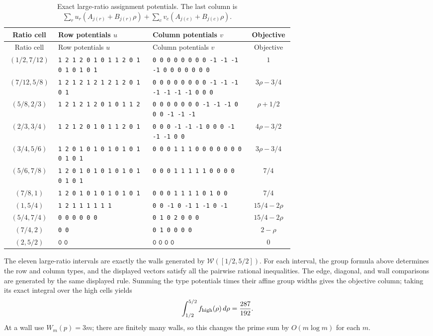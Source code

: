 \renewcommand{\arraystretch}{1.15}
\normalsize
\begin{longtable}{@{}c p{0.33\linewidth}p{0.34\linewidth}c@{}}
\caption{Exact large-ratio assignment potentials.  The last column is
  $\sum_r u_r(A_{j(r)}+B_{j(r)}\rho)+
    \sum_c v_c(A_{j(c)}+B_{j(c)}\rho)$.}\label{tab:p0-high-potentials}\\
\toprule
Ratio cell & Row potentials $u$ & Column potentials $v$ & Objective \\
\midrule
\endfirsthead
\toprule
Ratio cell & Row potentials $u$ & Column potentials $v$ & Objective \\
\midrule
\endhead
$(1/2,7/12)$ &
\texttt{1 2 1 2 0 1 0 1 1 2 0 1 0 1 0 1 0 1} &
\texttt{0 0 0 0 0 0 0 0 -1 -1 -1 -1 0 0 0 0 0 0 0} & $1$ \\
$(7/12,5/8)$ &
\texttt{1 2 1 2 1 2 1 2 1 2 0 1 0 1} &
\texttt{0 0 0 0 0 0 0 0 -1 -1 -1 -1 -1 -1 -1 0 0 0} & $3\rho-3/4$ \\
$(5/8,2/3)$ &
\texttt{1 2 1 2 1 2 0 1 0 1 1 2} &
\texttt{0 0 0 0 0 0 0 -1 -1 -1 0 0 0 -1 -1 -1} & $\rho+1/2$ \\
$(2/3,3/4)$ &
\texttt{1 2 1 2 0 1 0 1 1 2 0 1} &
\texttt{0 0 0 -1 -1 -1 0 0 0 -1 -1 -1 0 0} & $4\rho-3/2$ \\
$(3/4,5/6)$ &
\texttt{1 2 0 1 0 1 0 1 0 1 0 1 0 1 0 1} &
\texttt{0 0 0 1 1 1 0 0 0 0 0 0 0} & $3\rho-3/4$ \\
$(5/6,7/8)$ &
\texttt{1 2 0 1 0 1 0 1 0 1 0 1 0 1 0 1} &
\texttt{0 0 0 1 1 1 1 1 0 0 0 0} & $7/4$ \\
$(7/8,1)$ &
\texttt{1 2 0 1 0 1 0 1 0 1 0 1} &
\texttt{0 0 0 1 1 1 1 0 1 0 0} & $7/4$ \\
$(1,5/4)$ &
\texttt{1 2 1 1 1 1 1 1} &
\texttt{0 0 -1 0 -1 1 -1 0 -1} & $15/4-2\rho$ \\
$(5/4,7/4)$ &
\texttt{0 0 0 0 0 0} &
\texttt{0 1 0 2 0 0 0} & $15/4-2\rho$ \\
$(7/4,2)$ &
\texttt{0 0} &
\texttt{0 1 0 0 0 0} & $2-\rho$ \\
$(2,5/2)$ & $\texttt{0 0}$ & $\texttt{0 0 0 0}$ & $0$ \\
\bottomrule
\end{longtable}

The eleven large-ratio intervals are exactly the walls generated by
$\mathcal W([1/2,5/2])$.  For each interval, the group formula above
determines the row and column types, and the displayed vectors satisfy all
the pairwise rational inequalities.  The edge, diagonal, and wall comparisons
are generated by the same displayed rule.  Summing the
type potentials times their affine group widths
gives the objective column; taking its exact integral over the high cells
yields
\[
 \int_{1/2}^{5/2}f_{\rm high}(\rho)\,d\rho=\frac{287}{192}.
\]
At a wall use $W_m(p)=3m$; there are finitely many walls, so this changes
the prime sum by $O(m\log m)$ for each $m$.

